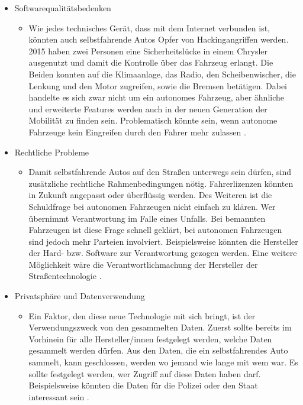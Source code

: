 \documentclass{sigchi}
\begin{document}
\begin{itemize}
    \item Softwarequalitätsbedenken
        \begin{itemize}
            \item Wie jedes technisches Gerät, dass mit dem Internet verbunden ist, könnten auch selbstfahrende Autos Opfer von Hackingangriffen werden. 2015 haben zwei Personen eine Sicherheitslücke in einem Chrysler ausgenutzt und damit die Kontrolle über das Fahrzeug erlangt. Die Beiden konnten auf die Klimaanlage, das Radio, den Scheibenwischer, die Lenkung und den Motor zugreifen, sowie die Bremsen betätigen. Dabei handelte es sich zwar nicht um ein autonomes Fahrzeug, aber ähnliche und erweiterte Features werden auch in der neuen Generation der Mobilität zu finden sein. Problematisch könnte sein, wenn autonome Fahrzeuge kein Eingreifen durch den Fahrer mehr zulassen \cite{privacy-and-security-issues:2019}.
    \end{itemize}
    \item Rechtliche Probleme
        \begin{itemize}
            \item Damit selbstfahrende Autos auf den Straßen unterwegs sein dürfen, sind zusätzliche rechtliche Rahmenbedingungen nötig. Fahrerlizenzen könnten in Zukunft angepasst oder überflüssig werden. Des Weiteren ist die Schuldfrage bei autonomen Fahrzeugen nicht einfach zu klären. Wer übernimmt Verantwortung im Falle eines Unfalls. Bei bemannten Fahrzeugen ist diese Frage schnell geklärt, bei autonomen Fahrzeugen sind jedoch mehr Parteien involviert. Beispielsweise könnten die Hersteller der Hard- bzw. Software zur Verantwortung gezogen werden. Eine weitere Möglichkeit wäre die Verantwortlichmachung der Hersteller der Straßentechnologie \cite{itf:2015}.
        \end{itemize}
    \item Privatsphäre und Datenverwendung
        \begin{itemize}
            \item Ein Faktor, den diese neue Technologie mit sich bringt, ist der Verwendungszweck von den gesammelten Daten. Zuerst sollte bereits im Vorhinein für alle Hersteller/innen festgelegt werden, welche Daten gesammelt werden dürfen. Aus den Daten, die ein selbstfahrendes Auto sammelt, kann geschlossen, werden wo jemand wie lange mit wem war. Es sollte festgelegt werden, wer Zugriff auf diese Daten haben darf. Beispielsweise könnten die Daten für die Polizei oder den Staat interessant sein \cite{glancy-privacy:2012}.
        \end{itemize}
\end{itemize}
\end{document}
